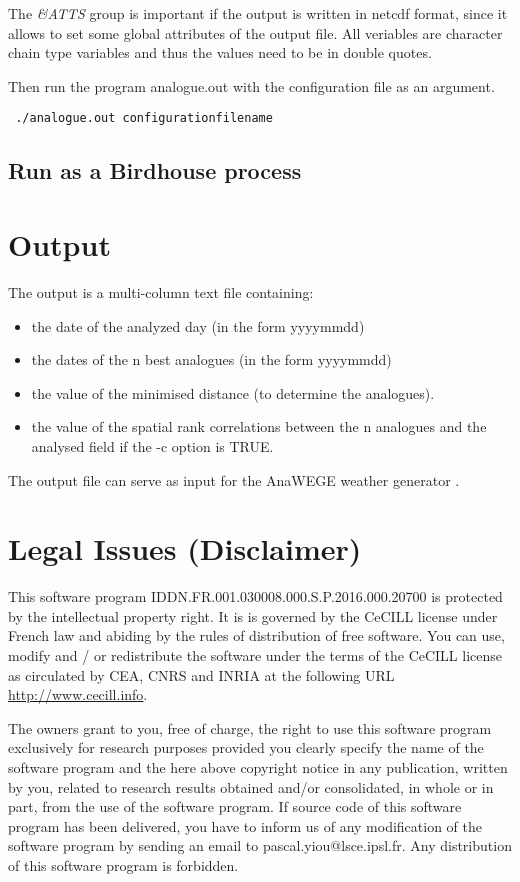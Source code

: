 \documentclass[11p,a4paper]{article}
\begin{document}
The \textit{\&ATTS} group is important if the output is written in netcdf format, since it allows to set some global attributes of the output file. All veriables are character chain type variables and thus the values need to be in double quotes.

Then run the program analogue.out with the configuration file as an argument.
\begin{verbatim}
 ./analogue.out configurationfilename
\end{verbatim}
\subsection{Run as a Birdhouse process}

\section{Output}
The output is a multi-column text file containing:
\begin{itemize}
 \item the date of the analyzed day (in the form yyyymmdd)
 \item the dates of the n best analogues (in the form yyyymmdd)
 \item the value of the minimised distance (to determine the analogues). 
 \item the value of the spatial rank correlations between the n analogues and the analysed field if the -c option is TRUE.
\end{itemize}

The output file can serve as input for the AnaWEGE weather generator \citep{yiou14a}.

\section{Legal Issues (Disclaimer)}
This software program IDDN.FR.001.030008.000.S.P.2016.000.20700 is protected by the intellectual property right. 
It is is governed by the CeCILL license under French law and abiding by the rules of distribution 
of free software. You can use, modify and / or redistribute the software under the terms of the 
 CeCILL license as circulated by CEA, CNRS and INRIA at the following URL \href{http://www.cecill.info}{http://www.cecill.info}.
 
The owners grant to you, free of charge, the right to use this software program exclusively for research purposes provided you clearly specify the name of the software program and the here above copyright notice in any publication, written by you, related to research results obtained and/or consolidated, in whole or in part, from the use of the software program. 
If source code of this software program has been delivered, you have to inform us of any modification of the software program by sending an email to pascal.yiou@lsce.ipsl.fr.
Any distribution of this software program is forbidden. 
\end{document}
